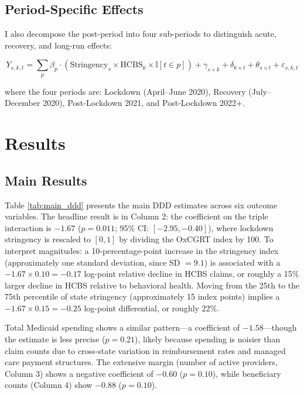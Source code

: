 \documentclass[12pt]{article}
\newcommand{\ind}{\mathbb{I}}
\begin{document}
\subsection{Period-Specific Effects}

I also decompose the post-period into four sub-periods to distinguish acute, recovery, and long-run effects:

\begin{equation}
Y_{s,k,t} = \sum_{p} \beta_p \cdot (\text{Stringency}_s \times \text{HCBS}_k \times \ind[t \in p]) + \gamma_{s \times k} + \delta_{k \times t} + \theta_{s \times t} + \varepsilon_{s,k,t}
\label{eq:periods}
\end{equation}

\noindent where the four periods are: Lockdown (April--June 2020), Recovery (July--December 2020), Post-Lockdown 2021, and Post-Lockdown 2022+.


\section{Results}

\subsection{Main Results}



Table \ref{tab:main_ddd} presents the main DDD estimates across six outcome variables. The headline result is in Column 2: the coefficient on the triple interaction is $-1.67$ ($p = 0.011$; 95\% CI: $[-2.95, -0.40]$), where lockdown stringency is rescaled to $[0,1]$ by dividing the OxCGRT index by 100. To interpret magnitudes: a 10-percentage-point increase in the stringency index (approximately one standard deviation, since SD $= 9.1$) is associated with a $-1.67 \times 0.10 = -0.17$ log-point relative decline in HCBS claims, or roughly a 15\% larger decline in HCBS relative to behavioral health. Moving from the 25th to the 75th percentile of state stringency (approximately 15 index points) implies a $-1.67 \times 0.15 = -0.25$ log-point differential, or roughly 22\%.

Total Medicaid spending shows a similar pattern---a coefficient of $-1.58$---though the estimate is less precise ($p = 0.21$), likely because spending is noisier than claim counts due to cross-state variation in reimbursement rates and managed care payment structures. The extensive margin (number of active providers, Column 3) shows a negative coefficient of $-0.60$ ($p = 0.10$), while beneficiary counts (Column 4) show $-0.88$ ($p = 0.10$).
\end{document}
